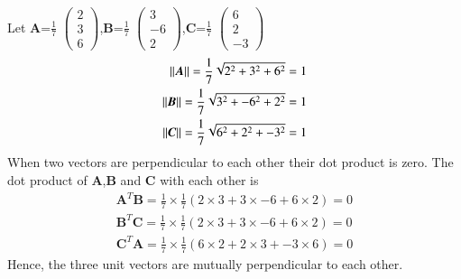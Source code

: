 Let $\bm{A}$=\(\frac{1}{7}\) $\begin{pmatrix}2 \\3 \\6\end{pmatrix}$,$\bm{B}$=\(\frac{1}{7}\) $\begin{pmatrix}3 \\-6 \\2\end{pmatrix}$,$\bm{C}$=\(\frac{1}{7}\) $\begin{pmatrix}6 \\2 \\-3\end{pmatrix}$\\
\begin{align}
    \left\lVert\bm{A}\right\rVert=\frac{1}{7}\sqrt{2^2+3^2+6^2}=1\\
    \left\lVert\bm{B}\right\rVert=\frac{1}{7}\sqrt{3^2+-6^2+2^2}=1\\
    \left\lVert\bm{C}\right\rVert=\frac{1}{7}\sqrt{6^2+2^2+-3^2}=1
\end{align}
When two vectors are perpendicular to each other their dot product is zero.
The dot product of $\bm{A}$,$\bm{B}$ and $\bm{C}$ with each other is
\begin{align}
    \bm{A}^T\bm{B}=\frac{1}{7} \times \frac{1}{7}(2 \times 3+3 \times -6+6 \times 2)=0\\
    \bm{B}^T\bm{C}=\frac{1}{7} \times \frac{1}{7}(2 \times 3+3 \times -6+6 \times 2)=0\\
    \bm{C}^T\bm{A}=\frac{1}{7} \times \frac{1}{7}(6 \times 2+2 \times 3+-3 \times 6)=0
\end{align}
Hence, the three unit vectors are mutually perpendicular to each other.
